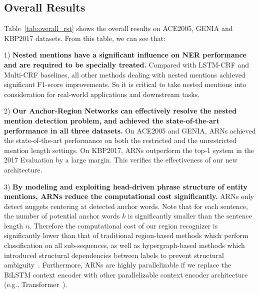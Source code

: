 \documentclass[11pt,a4paper]{article}
\begin{document}
\subsection{Overall Results}
Table~\ref{tab:overall_rst} shows the overall results on ACE2005, GENIA and KBP2017 datasets. From this table, we can see that:

1) \textbf{Nested mentions have a significant influence on NER performance and are required to be specially treated.} Compared with LSTM-CRF and Multi-CRF baselines, all other methods dealing with nested mentions achieved significant F1-score improvements. So it is critical to take nested mentions into consideration for real-world applications and downstream tasks.

2) \textbf{Our Anchor-Region Networks can effectively resolve the nested mention detection problem, and achieved the state-of-the-art performance in all three datasets.} On ACE2005 and GENIA, ARNs achieved the state-of-the-art performance on both the restricted and the unrestricted mention length settings. On KBP2017, ARNs outperform the top-1 system in the 2017 Evaluation by a large margin. This verifies the effectiveness of our new architecture.

3) \textbf{By modeling and exploiting head-driven phrase structure of entity mentions, ARNs reduce the computational cost significantly.} ARNs only detect nuggets centering at detected anchor words. Note that for each sentence, the number of potential anchor words $k$ is significantly smaller than the sentence length $n$. Therefore the computational cost of our region recognizer is significantly lower than that of traditional region-based methods which perform classification on all sub-sequences, as well as hypergraph-based methods which introduced structural dependencies between labels to prevent structural ambiguity~\cite{D18-1019}. Furthermore, ARNs are highly parallelizable if we replace the BiLSTM context encoder with other parallelizable context encoder architecture (e.g., Transformer~\cite{NIPS2017_7181}).
\end{document}
